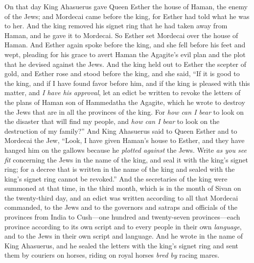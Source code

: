 \begin{biblechapter} %
 On that day King Ahasuerus gave Queen Esther the house of Haman, the enemy of the Jews; and Mordecai came before the king, for Esther had told what he was to her.
\verse And the king removed his signet ring that he had taken away from Haman, and he gave it to Mordecai. So Esther set Mordecai over the house of Haman.
\verse And Esther again spoke before the king, and she fell before his feet and wept, pleading for his grace to avert Haman the Agagite’s evil plan and the plot that he devised against the Jews.
\verse And the king held out to Esther the scepter of gold, and Esther rose and stood before the king,
\verse and she said, “If it is good to the king, and if I have found favor before him, and if the king is pleased with this matter, and \textit{I have his approval}, let an edict be written to revoke the letters of the plans of Haman son of Hammedatha the Agagite, which he wrote to destroy the Jews that are in all the provinces of the king.
\verse For \textit{how can I bear} to look on the disaster that will find my people, and \textit{how can I bear} to look on the destruction of my family?”
\verse And King Ahasuerus said to Queen Esther and to Mordecai the Jew, “Look, I have given Haman’s house to Esther, and they have hanged him on the gallows because he \textit{plotted against} the Jews.
\verse Write \textit{as you see fit} concerning the Jews in the name of the king, and seal it with the king’s signet ring; for a decree that is written in the name of the king and sealed with the king’s signet ring cannot be revoked.”
\verse And the secretaries of the king were summoned at that time, in the third month, which is in the month of Sivan on the twenty-third day, and an edict was written according to all that Mordecai commanded, to the Jews and to the governors and satraps and officials of the provinces from India to Cush—one hundred and twenty-seven provinces—each province according to its own script and to every people in their own \textit{language}, and to the Jews in their own script and language.
\verse And he wrote in the name of King Ahasuerus, and he sealed the letters with the king’s signet ring and sent them by couriers on horses, riding on royal horses \textit{bred by} racing mares.

\end{biblechapter}
